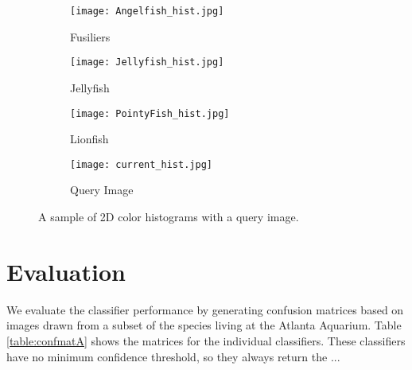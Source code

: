 \documentclass[10pt,twocolumn,letterpaper]{article}
\begin{document}
\begin{figure*}[ht]
\begin{center}
	\begin{subfigure}[b]{0.24\linewidth}
		\texttt{[image: Angelfish\_hist.jpg]}
		\caption{Fusiliers}
	\end{subfigure}
	\begin{subfigure}[b]{0.24\linewidth}
		\texttt{[image: Jellyfish\_hist.jpg]}
		\caption{Jellyfish}
	\end{subfigure}
	\begin{subfigure}[b]{0.24\linewidth}
		\texttt{[image: PointyFish\_hist.jpg]}
		\caption{Lionfish}
	\end{subfigure}
	\begin{subfigure}[b]{0.24\linewidth}
		\texttt{[image: current\_hist.jpg]}
		\caption{Query Image}
	\end{subfigure}

\end{center}
\caption{\small A sample of 2D color histograms with a query image.}
\label{fig:colorHists}
\end{figure*}

\section{Evaluation}
We evaluate the classifier performance by generating confusion matrices based on images drawn from a subset of the species living at the Atlanta Aquarium. Table \ref{table:confmatA} shows the matrices for the individual classifiers. These classifiers have no minimum confidence threshold, so they always return the ...
\end{document}

